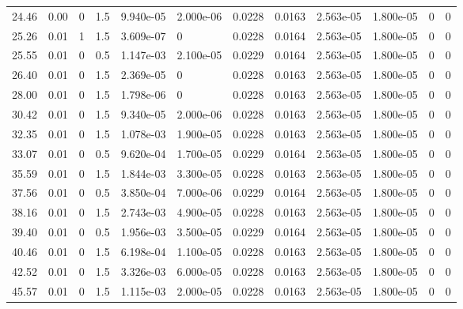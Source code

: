 \documentclass[preview]{standalone}
\begin{document}
{{\begin{tabular}{L{1.2cm}C{1.2cm} C{0.3cm}C{0.5cm} C{1.4cm}C{1.4cm} C{1.4cm}C{1.4cm} C{1.6cm}C{1.6cm} C{1.6cm}C{1.6cm}}
  24.46  &  0.00  & 0     & 1.5 &  9.940e-05  & 2.000e-06  &  0.0228&   0.0163& 2.563e-05 & 1.800e-05   &  0 & 0  \\ 
  25.26  &  0.01  & 1     & 1.5 &  3.609e-07  & 0  &  0.0228&   0.0164& 2.563e-05 & 1.800e-05   &  0 & 0  \\ 
  25.55  &  0.01  & 0     & 0.5 &  1.147e-03  & 2.100e-05  &  0.0229&   0.0164& 2.563e-05 & 1.800e-05   &  0 & 0  \\ 
  26.40  &  0.01  & 0     & 1.5 &  2.369e-05  & 0  &  0.0228&   0.0163& 2.563e-05 & 1.800e-05   &  0 & 0  \\ 
  28.00  &  0.01  & 0     & 1.5 &  1.798e-06  & 0  &  0.0228&   0.0163& 2.563e-05 & 1.800e-05   &  0 & 0  \\ 
  30.42  &  0.01  & 0     & 1.5 &  9.340e-05  & 2.000e-06  &  0.0228&   0.0163& 2.563e-05 & 1.800e-05   &  0 & 0  \\ 
  32.35  &  0.01  & 0     & 1.5 &  1.078e-03  & 1.900e-05  &  0.0228&   0.0163& 2.563e-05 & 1.800e-05   &  0 & 0  \\ 
  33.07  &  0.01  & 0     & 0.5 &  9.620e-04  & 1.700e-05  &  0.0229&   0.0164& 2.563e-05 & 1.800e-05   &  0 & 0  \\ 
  35.59  &  0.01  & 0     & 1.5 &  1.844e-03  & 3.300e-05  &  0.0228&   0.0163& 2.563e-05 & 1.800e-05   &  0 & 0  \\ 
  37.56  &  0.01  & 0     & 0.5 &  3.850e-04  & 7.000e-06  &  0.0229&   0.0164& 2.563e-05 & 1.800e-05   &  0 & 0  \\ 
  38.16  &  0.01  & 0     & 1.5 &  2.743e-03  & 4.900e-05  &  0.0228&   0.0163& 2.563e-05 & 1.800e-05   &  0 & 0  \\ 
  39.40  &  0.01  & 0     & 0.5 &  1.956e-03  & 3.500e-05  &  0.0229&   0.0164& 2.563e-05 & 1.800e-05   &  0 & 0  \\ 
  40.46  &  0.01  & 0     & 1.5 &  6.198e-04  & 1.100e-05  &  0.0228&   0.0163& 2.563e-05 & 1.800e-05   &  0 & 0  \\ 
  42.52  &  0.01  & 0     & 1.5 &  3.326e-03  & 6.000e-05  &  0.0228&   0.0163& 2.563e-05 & 1.800e-05   &  0 & 0  \\ 
  45.57  &  0.01  & 0     & 1.5 &  1.115e-03  & 2.000e-05  &  0.0228&   0.0163& 2.563e-05 & 1.800e-05   &  0 & 0  \\ 
\hline 
\end{tabular} 

}}
\end{document}
